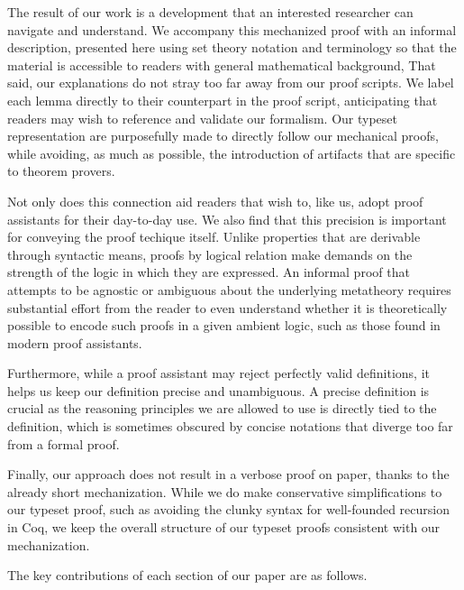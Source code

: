 \documentclass[acmsmall,screen=true,
\ifpublic review=false\else,review=true\fi
  ,anonymous=\ifanonymous true\else false\fi]{acmart}
\newcommand{\scw}[1]{}
\begin{document}
The result of our work is a development that an interested researcher can
navigate and understand. We accompany this mechanized proof with an informal
description, presented here using set theory notation and terminology so that
the material is accessible to readers with general mathematical background,
That said, our explanations do not stray too far away from our proof scripts.
We label each lemma directly to their counterpart in the proof script,
anticipating that readers may wish to reference and validate our formalism.
Our typeset representation are purposefully made to directly follow our
mechanical proofs, while avoiding, as much as possible, the introduction
of artifacts that are specific to theorem provers.

Not only does this connection aid readers that wish to, like us, adopt proof
assistants for their day-to-day use. We also find that this precision is
important for conveying the proof techique itself. Unlike properties that are
derivable through syntactic means, proofs by logical relation make demands on
the strength of the logic in which they are expressed. An informal proof that
attempts to be agnostic or ambiguous about the underlying
metatheory %
requires substantial
effort from the reader to even understand whether it is theoretically
possible to encode such proofs in a given ambient logic, such as those found
in modern proof assistants.

Furthermore, while a proof assistant may reject perfectly valid definitions,
it helps us keep our definition precise and unambiguous. A precise definition
is crucial as the reasoning principles we are allowed to use is directly tied
to the definition, which is sometimes obscured by concise notations that
diverge too far from a formal proof.

Finally, our approach does not result in a verbose proof on paper, thanks to
the already short mechanization. While we do make conservative simplifications
to our typeset proof, such as avoiding the clunky syntax for well-founded
recursion in Coq, we keep the overall structure of our typeset proofs
consistent with our mechanization.

The key contributions of each section of our paper are as follows.
\scw{I'm still not happy with this overview / contributions list. }
\end{document}

